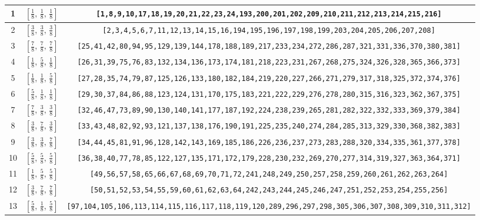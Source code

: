 \documentclass[fleqn,8pt]{jsarticle}
\begin{document}
\begin{longtable}{ccc}
1 & $\left[ \frac{1}{8},\, \frac{1}{8},\, \frac{1}{8} \right]$ & {\tt [1,8,9,10,17,18,19,20,21,22,23,24,193,200,201,202,209,210,211,212,213,214,215,216]} \\ \hline
2 & $\left[ \frac{3}{8},\, \frac{3}{8},\, \frac{3}{8} \right]$ & {\tt [2,3,4,5,6,7,11,12,13,14,15,16,194,195,196,197,198,199,203,204,205,206,207,208]} \\ \hline
3 & $\left[ \frac{7}{8},\, \frac{7}{8},\, \frac{7}{8} \right]$ & {\tt [25,41,42,80,94,95,129,139,144,178,188,189,217,233,234,272,286,287,321,331,336,370,380,381]} \\ \hline
4 & $\left[ \frac{1}{8},\, \frac{5}{8},\, \frac{1}{8} \right]$ & {\tt [26,31,39,75,76,83,132,134,136,173,174,181,218,223,231,267,268,275,324,326,328,365,366,373]} \\ \hline
5 & $\left[ \frac{1}{8},\, \frac{1}{8},\, \frac{5}{8} \right]$ & {\tt [27,28,35,74,79,87,125,126,133,180,182,184,219,220,227,266,271,279,317,318,325,372,374,376]} \\ \hline
6 & $\left[ \frac{5}{8},\, \frac{1}{8},\, \frac{1}{8} \right]$ & {\tt [29,30,37,84,86,88,123,124,131,170,175,183,221,222,229,276,278,280,315,316,323,362,367,375]} \\ \hline
7 & $\left[ \frac{7}{8},\, \frac{3}{8},\, \frac{3}{8} \right]$ & {\tt [32,46,47,73,89,90,130,140,141,177,187,192,224,238,239,265,281,282,322,332,333,369,379,384]} \\ \hline
8 & $\left[ \frac{3}{8},\, \frac{7}{8},\, \frac{3}{8} \right]$ & {\tt [33,43,48,82,92,93,121,137,138,176,190,191,225,235,240,274,284,285,313,329,330,368,382,383]} \\ \hline
9 & $\left[ \frac{3}{8},\, \frac{3}{8},\, \frac{7}{8} \right]$ & {\tt [34,44,45,81,91,96,128,142,143,169,185,186,226,236,237,273,283,288,320,334,335,361,377,378]} \\ \hline
10 & $\left[ \frac{5}{8},\, \frac{5}{8},\, \frac{5}{8} \right]$ & {\tt [36,38,40,77,78,85,122,127,135,171,172,179,228,230,232,269,270,277,314,319,327,363,364,371]} \\ \hline
11 & $\left[ \frac{1}{8},\, \frac{5}{8},\, \frac{5}{8} \right]$ & {\tt [49,56,57,58,65,66,67,68,69,70,71,72,241,248,249,250,257,258,259,260,261,262,263,264]} \\ \hline
12 & $\left[ \frac{3}{8},\, \frac{7}{8},\, \frac{7}{8} \right]$ & {\tt [50,51,52,53,54,55,59,60,61,62,63,64,242,243,244,245,246,247,251,252,253,254,255,256]} \\ \hline
13 & $\left[ \frac{5}{8},\, \frac{1}{8},\, \frac{5}{8} \right]$ & {\tt [97,104,105,106,113,114,115,116,117,118,119,120,289,296,297,298,305,306,307,308,309,310,311,312]} \\ \hline

\end{longtable}
\end{document}
